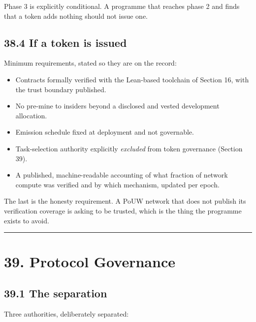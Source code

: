 \documentclass[
  11pt]{report}
\providecommand{\tightlist}{%
  \setlength{\itemsep}{0pt}\setlength{\parskip}{0pt}}
\begin{document}
Phase 3 is explicitly conditional. A programme that reaches phase 2 and
finds that a token adds nothing should not issue one.

\hypertarget{if-a-token-is-issued}{%
\section{38.4 If a token is issued}\label{if-a-token-is-issued}}

Minimum requirements, stated so they are on the record:

\begin{itemize}
\tightlist
\item
  Contracts formally verified with the Lean-based toolchain of Section
  16, with the trust boundary published.
\item
  No pre-mine to insiders beyond a disclosed and vested development
  allocation.
\item
  Emission schedule fixed at deployment and not governable.
\item
  Task-selection authority explicitly \emph{excluded} from token
  governance (Section 39).
\item
  A published, machine-readable accounting of what fraction of network
  compute was verified and by which mechanism, updated per epoch.
\end{itemize}

The last is the honesty requirement. A PoUW network that does not
publish its verification coverage is asking to be trusted, which is the
thing the programme exists to avoid.

\begin{center}\rule{0.5\linewidth}{0.5pt}\end{center}

\hypertarget{protocol-governance}{%
\chapter{39. Protocol Governance}\label{protocol-governance}}

\hypertarget{the-separation}{%
\section{39.1 The separation}\label{the-separation}}

Three authorities, deliberately separated:
\end{document}
